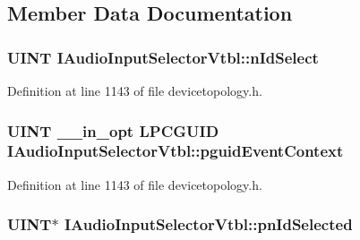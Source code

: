 \subsection{Member Data Documentation}
\subsubsection[{\texorpdfstring{n\+Id\+Select}{nIdSelect}}]{ {\bf U\+I\+NT} I\+Audio\+Input\+Selector\+Vtbl\+::n\+Id\+Select}\hypertarget{struct_i_audio_input_selector_vtbl_ae01282b0cf8636a5979f9fe06c8ec8b8}{}\label{struct_i_audio_input_selector_vtbl_ae01282b0cf8636a5979f9fe06c8ec8b8}


Definition at line 1143 of file devicetopology.\+h.

\subsubsection[{\texorpdfstring{pguid\+Event\+Context}{pguidEventContext}}]{ {\bf U\+I\+NT} {\bf \+\_\+\+\_\+in\+\_\+opt} {\bf L\+P\+C\+G\+U\+ID} I\+Audio\+Input\+Selector\+Vtbl\+::pguid\+Event\+Context}\hypertarget{struct_i_audio_input_selector_vtbl_a35b1ebc40389a4bafa8acb27e9d6a984}{}\label{struct_i_audio_input_selector_vtbl_a35b1ebc40389a4bafa8acb27e9d6a984}


Definition at line 1143 of file devicetopology.\+h.

\subsubsection[{\texorpdfstring{pn\+Id\+Selected}{pnIdSelected}}]{ {\bf U\+I\+NT}$\ast$ I\+Audio\+Input\+Selector\+Vtbl\+::pn\+Id\+Selected}\hypertarget{struct_i_audio_input_selector_vtbl_ad6ff9afe59f18b7edbf695beeada2566}{}\label{struct_i_audio_input_selector_vtbl_ad6ff9afe59f18b7edbf695beeada2566}


